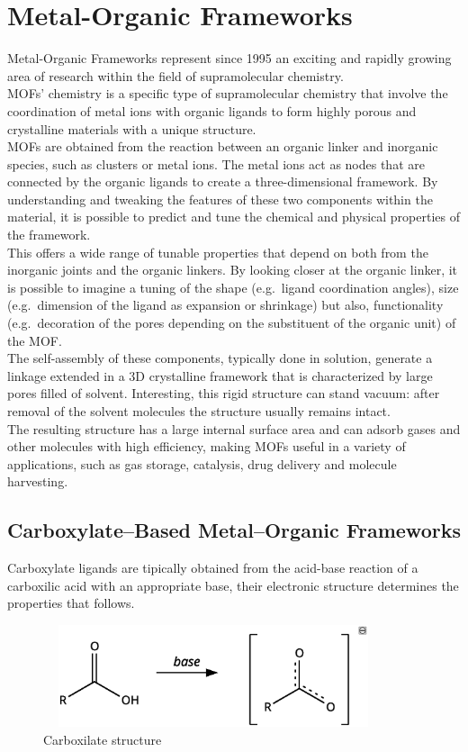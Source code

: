 \documentclass[../Master.tex]{subfiles}
\begin{document}
\section{Metal-Organic Frameworks}\label{subsec:mof}
Metal-Organic Frameworks represent since 1995 \cite{yaghi_hydrothermal_1995} an exciting and rapidly growing area of research within the field of supramolecular chemistry.\\
MOFs' chemistry is a specific type of supramolecular chemistry that involve the coordination of metal ions with organic ligands to form highly porous and crystalline materials with a unique structure. \\
MOFs are obtained from the reaction between an organic linker and inorganic species, such as clusters or metal ions. The metal ions act as nodes that are connected by the organic ligands to create a three-dimensional framework. By understanding and tweaking the features of these two components within the material, it is possible to predict and tune the chemical and physical properties of the framework.\\
This offers a wide range of tunable properties that depend on both from the inorganic joints and the organic linkers. By looking closer at the organic linker, it is possible to imagine a tuning of the shape (e.g.\ ligand coordination angles), size (e.g.\ dimension of the ligand as expansion or shrinkage) but also, functionality (e.g.\ decoration of the pores depending on the substituent of the organic unit) of the MOF.\\
The self-assembly of these components, typically done in solution, generate a linkage extended in a 3D crystalline framework that is characterized by large pores filled of solvent. Interesting, this rigid structure can stand vacuum: after removal of the solvent molecules the structure usually remains intact. \\
The resulting structure has a large internal surface area and can adsorb gases and other molecules with high efficiency, making MOFs useful in a variety of applications, such as gas storage, catalysis, drug delivery and molecule harvesting.

\subsection{Carboxylate–Based Metal–Organic Frameworks}\label{cb-mof}

Carboxylate ligands are tipically obtained from the acid-base reaction of a carboxilic acid with an appropriate base, their electronic structure determines the properties that follows. \\
\begin{figure}[h!]
	\centering
	\includegraphics[width=10cm,height=3cm,keepaspectratio]{Structures/carboxstructure.eps}
	\caption{Carboxilate structure}\label{fig:carboxstructure}
\end{figure}
\end{document}
